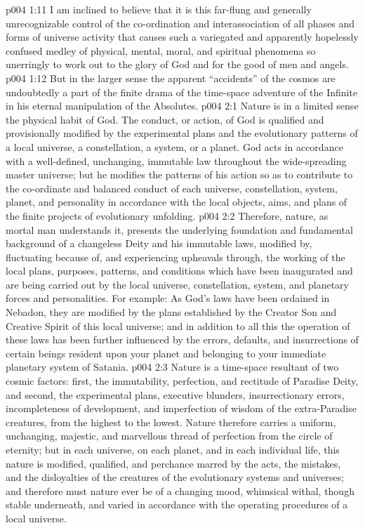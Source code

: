 \vs p004 1:11 I am inclined to believe that it is this far\hyp{}flung and generally unrecognizable control of the co\hyp{}ordination and interassociation of all phases and forms of universe activity that causes such a variegated and apparently hopelessly confused medley of physical, mental, moral, and spiritual phenomena so unerringly to work out to the glory of God and for the good of men and angels.
\vs p004 1:12 But in the larger sense the apparent “accidents” of the cosmos are undoubtedly a part of the finite drama of the time\hyp{}space adventure of the Infinite in his eternal manipulation of the Absolutes.
\vs p004 2:1 Nature is in a limited sense the physical habit of God. The conduct, or action, of God is qualified and provisionally modified by the experimental plans and the evolutionary patterns of a local universe, a constellation, a system, or a planet. God acts in accordance with a well\hyp{}defined, unchanging, immutable law throughout the wide\hyp{}spreading master universe; but he modifies the patterns of his action so as to contribute to the co\hyp{}ordinate and balanced conduct of each universe, constellation, system, planet, and personality in accordance with the local objects, aims, and plans of the finite projects of evolutionary unfolding.
\vs p004 2:2 Therefore, nature, as mortal man understands it, presents the underlying foundation and fundamental background of a changeless Deity and his immutable laws, modified by, fluctuating because of, and experiencing upheavals through, the working of the local plans, purposes, patterns, and conditions which have been inaugurated and are being carried out by the local universe, constellation, system, and planetary forces and personalities. For example: As God’s laws have been ordained in Nebadon, they are modified by the plans established by the Creator Son and Creative Spirit of this local universe; and in addition to all this the operation of these laws has been further influenced by the errors, defaults, and insurrections of certain beings resident upon your planet and belonging to your immediate planetary system of Satania.
\vs p004 2:3 \pc Nature is a time\hyp{}space resultant of two cosmic factors: first, the immutability, perfection, and rectitude of Paradise Deity, and second, the experimental plans, executive blunders, insurrectionary errors, incompleteness of development, and imperfection of wisdom of the extra\hyp{}Paradise creatures, from the highest to the lowest. Nature therefore carries a uniform, unchanging, majestic, and marvellous thread of perfection from the circle of eternity; but in each universe, on each planet, and in each individual life, this nature is modified, qualified, and perchance marred by the acts, the mistakes, and the disloyalties of the creatures of the evolutionary systems and universes; and therefore must nature ever be of a changing mood, whimsical withal, though stable underneath, and varied in accordance with the operating procedures of a local universe.
